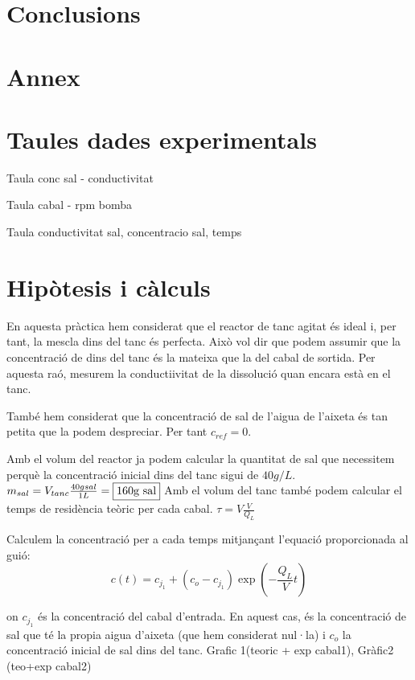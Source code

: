 \documentclass[10pt, twoside]{article}
\begin{document}
\section{Conclusions}

\section*{Annex}

\appendix

\section{Taules dades experimentals}

Taula conc sal - conductivitat

Taula cabal - rpm bomba

Taula conductivitat sal, concentracio sal, temps

\section{Hipòtesis i càlculs}

En aquesta pràctica hem considerat que el reactor de tanc agitat és ideal i, per tant, la mescla dins del tanc és perfecta. Això vol dir que podem assumir que la concentració de dins del tanc és la mateixa que la del cabal de sortida. Per aquesta raó, mesurem la conductiivitat de la dissolució quan encara està en el tanc.

També hem considerat que la concentració de sal de l'aigua de l'aixeta és tan petita que la podem despreciar. Per tant $c_{ref} = 0$.

Amb el volum del reactor ja podem calcular la quantitat de sal que necessitem perquè la concentració inicial dins del tanc sigui de $40g/L$. 
    $m_{sal} = V_{tanc}\frac{40g sal}{1L} = \fbox{160g sal}$
Amb el volum del tanc també podem calcular el temps de residència teòric per cada cabal.
    $\tau = V\frac{V}{Q_L}$

Calculem la concentració per a cada temps mitjançant l'equació proporcionada al guió:
\begin{equation}
    c(t) = c_{j_1} + (c_o-c_{j_1})\exp\left(-\frac{Q_L}{V}t\right) 
    \label{c(t)}   
\end{equation}

on $c_{j_1}$ és la concentració del cabal d'entrada. En aquest cas, és la concentració de sal que té la propia aigua d'aixeta (que hem considerat nul·la) i $c_o$ la concentració inicial de sal dins del tanc.
Grafic 1(teoric + exp cabal1), Gràfic2 (teo+exp cabal2)
\end{document}
